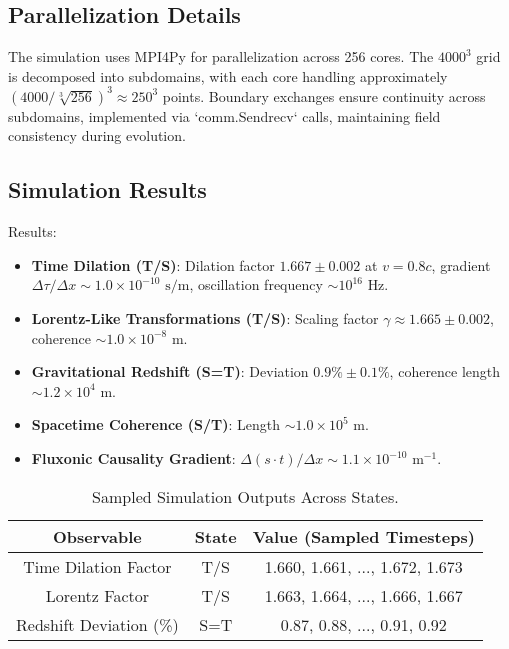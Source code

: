 \documentclass[11pt]{article}
\begin{document}
\subsection{Parallelization Details}
The simulation uses MPI4Py for parallelization across 256 cores. The \(4000^3\) grid is decomposed into subdomains, with each core handling approximately \( (4000 / \sqrt[3]{256})^3 \approx 250^3 \) points. Boundary exchanges ensure continuity across subdomains, implemented via `comm.Sendrecv` calls, maintaining field consistency during evolution.

\subsection{Simulation Results}
Results:
\begin{itemize}
    \item \textbf{Time Dilation (T/S)}: Dilation factor \( 1.667 \pm 0.002 \) at \( v = 0.8c \), gradient \(\Delta \tau / \Delta x \sim 1.0 \times 10^{-10} \text{ s/m}\), oscillation frequency \(\sim 10^{16} \text{ Hz}\).
    \item \textbf{Lorentz-Like Transformations (T/S)}: Scaling factor \(\gamma \approx 1.665 \pm 0.002\), coherence \(\sim 1.0 \times 10^{-8} \text{ m}\).
    \item \textbf{Gravitational Redshift (S=T)}: Deviation \( 0.9\% \pm 0.1\% \), coherence length \(\sim 1.2 \times 10^4 \text{ m}\).
    \item \textbf{Spacetime Coherence (S/T)}: Length \(\sim 1.0 \times 10^5 \text{ m}\).
    \item \textbf{Fluxonic Causality Gradient}: \(\Delta (s \cdot t) / \Delta x \sim 1.1 \times 10^{-10} \text{ m}^{-1}\).
\end{itemize}

\begin{table}[htbp]
    \centering
    \begin{tabular}{|c|c|c|}
        \hline
        \textbf{Observable} & \textbf{State} & \textbf{Value (Sampled Timesteps)} \\
        \hline
        Time Dilation Factor & T/S & 1.660, 1.661, ..., 1.672, 1.673 \\
        Lorentz Factor & T/S & 1.663, 1.664, ..., 1.666, 1.667 \\
        Redshift Deviation (\%) & S=T & 0.87, 0.88, ..., 0.91, 0.92 \\
        \hline
    \end{tabular}
    \caption{Sampled Simulation Outputs Across States.}
    \label{tab:sim_outputs}
\end{table}
\end{document}
